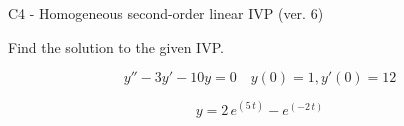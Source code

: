\begin{exercise}
  \begin{exerciseTitle}C4 - Homogeneous second-order linear IVP (ver. 6)\end{exerciseTitle}
  \begin{exerciseStatement}
    
Find the solution to the given IVP.

    
\[y''-3y'-10y = 0 \hspace{1em} y(0) = 1 , y'(0) = 12\]

  \end{exerciseStatement}
  \begin{exerciseAnswer}
    
\[y= 2 \, e^{\left(5 \, t\right)} - e^{\left(-2 \, t\right)}\]

  \end{exerciseAnswer}
\end{exercise}